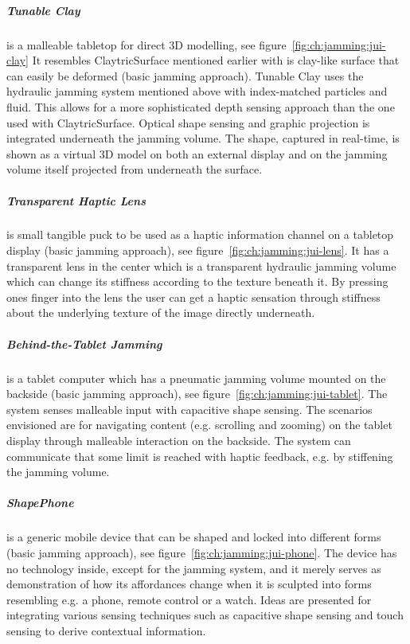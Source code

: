 \subparagraph{Tunable Clay} is a malleable tabletop for direct 3D modelling, see figure~\ref{fig:ch:jamming:jui-clay}
It resembles ClaytricSurface \citep{matoba2012claytricsurface} mentioned earlier with is clay-like surface that can easily be deformed (basic jamming approach).
Tunable Clay uses the hydraulic jamming system mentioned above with index-matched particles and fluid.
This allows for a more sophisticated depth sensing approach than the one used with ClaytricSurface.
Optical shape sensing and graphic projection is integrated underneath the jamming volume.
The shape, captured in real-time, is shown as a virtual 3D model on both an external display and on the jamming volume itself projected from underneath the surface.

\subparagraph{Transparent Haptic Lens} is small tangible puck to be used as a haptic information channel on a tabletop display (basic jamming approach), see figure~\ref{fig:ch:jamming:jui-lens}.
It has a transparent lens in the center which is a transparent hydraulic jamming volume which can change its stiffness according to the texture beneath it.
By pressing ones finger into the lens the user can get a haptic sensation through stiffness about the underlying texture of the image directly underneath. 

\subparagraph{Behind-the-Tablet Jamming} is a tablet computer which has a pneumatic jamming volume mounted on the backside (basic jamming approach), see figure~\ref{fig:ch:jamming:jui-tablet}.
The system senses malleable input with capacitive shape sensing.
The scenarios envisioned are for navigating content (e.g. scrolling and zooming) on the tablet display through malleable interaction on the backside. 
The system can communicate that some limit is reached with haptic feedback, 
e.g. by stiffening the jamming volume.

\subparagraph{ShapePhone} is a generic mobile device that can be shaped and locked into different forms (basic jamming approach), see figure~\ref{fig:ch:jamming:jui-phone}.
The device has no technology inside, except for the jamming system, and it merely serves as demonstration of how its affordances change when it is sculpted into forms resembling e.g. a phone, remote control or a watch.
Ideas are presented for integrating various sensing techniques such as capacitive shape sensing and touch sensing to derive contextual information.

